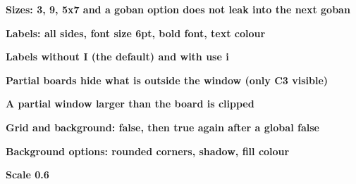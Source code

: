 \documentclass{article}
\newcommand\case[1]{\par\medskip\noindent\textbf{#1}\par\nopagebreak}
\begin{document}
\case{Sizes: 3, 9, 5x7 and a goban option does not leak into the next goban}
\begin{goban}[3]\end{goban}
\begin{goban}[5x7]\end{goban}
\begin{goban}\end{goban}

\case{Labels: all sides, font size 6pt, bold font, text colour}
\begin{goban}[5, label = {at = all}]\end{goban}
\begin{goban}[5, label = {at = {south, west}, font size = 6pt}]\end{goban}
\begin{goban}[5, label = {at = {south, west}, font = \bfseries, color = red}]\end{goban}

\case{Labels without I (the default) and with use i}
\begin{goban}[9, label = {at = {south}}]\end{goban}
\begin{goban}[9, use i, label = {at = {south}}]\end{goban}

\case{Partial boards hide what is outside the window (only C3 visible)}
\begin{goban}[5, partial = B2:D4]\end{goban}

\case{A partial window larger than the board is clipped}
\begin{goban}[3, partial = B2:D4]\stones[b]{*}\end{goban}

\case{Grid and background: false, then true again after a global false}
\begin{goban}[5, grid = false]\end{goban}
\begin{goban}[5, background = false]\end{goban}
\begin{goban}[5, background = true]\end{goban}

\case{Background options: rounded corners, shadow, fill colour}
\begin{goban}[5, background = {rounded corners = {outer = 6pt}, shadow = true, fill = {color = orange!30}}]\end{goban}

\case{Scale 0.6}
\begin{goban}[5, scale = 0.6]\end{goban}
\end{document}
